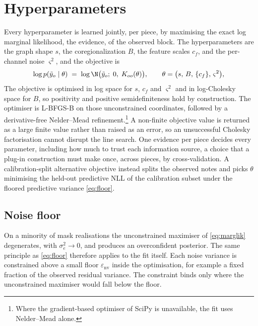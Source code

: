 \section{Hyperparameters}
\label{sec:eb}
Every hyperparameter is learned jointly, per piece, by maximising the exact
log marginal likelihood, the evidence, of the observed block. The
hyperparameters are the graph shape $s$, the coregionalization $B$, the
feature scales $c_f$, and the per-channel noise $\varsigma^2$, and the
objective is
\begin{equation}
  \log p(\tilde y_o \mid \theta)
  \;=\; \log \N\bigl(\tilde y_o;\; 0,\; K_{oo}(\theta)\bigr),
  \qquad \theta = \bigl(s,\, B,\, \{c_f\},\, \varsigma^2\bigr),
  \label{eq:marglik}
\end{equation}
The objective is optimised in log space for $s$, $c_f$ and $\varsigma^2$ and
in log-Cholesky space for $B$, so positivity and positive semidefiniteness
hold by construction. The optimiser is L-BFGS-B on those unconstrained
coordinates, followed by a derivative-free Nelder--Mead
refinement.\footnote{Where the gradient-based optimiser of SciPy is
unavailable, the fit uses Nelder--Mead alone.} A non-finite objective value
is returned as a large finite value rather than raised as an error, so an
unsuccessful Cholesky factorisation cannot disrupt the line search. One
evidence per piece decides every parameter, including how much to trust each
information source, a choice that a plug-in construction must make once,
across pieces, by cross-validation. A calibration-split alternative
objective instead splits the observed notes and picks $\theta$ minimising
the held-out predictive NLL of the calibration subset under the floored
predictive variance \eqref{eq:floor}.

\subsection{Noise floor}
On a minority of mask realisations the unconstrained maximiser of
\eqref{eq:marglik} degenerates, with $\sigma_e^2 \to 0$, and produces an
overconfident posterior. The same principle as \eqref{eq:floor} therefore
applies to the fit itself. Each noise variance is constrained above a small
floor $\varepsilon_{\mathrm{nv}}$ inside the optimisation, for example a
fixed fraction of the observed residual variance. The constraint binds only
where the unconstrained maximiser would fall below the floor.

